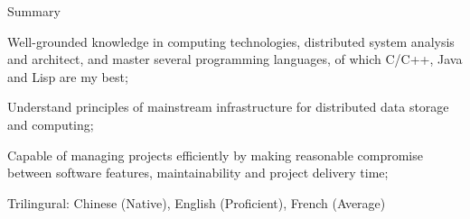 \documentclass{resume} %
\begin{document}
\begin{rSection}{Summary}

\item Well-grounded knowledge in computing technologies, distributed system analysis and architect,
 and master several programming languages, of which C/C++, Java and Lisp are my best;
\item Understand principles of mainstream infrastructure for distributed data storage and computing;
\item Capable of managing projects efficiently by making reasonable compromise between software features, 
maintainability and project delivery time;
\item Trilingural: Chinese (Native), English (Proficient), French (Average)
\end{rSection}





\end{document}
